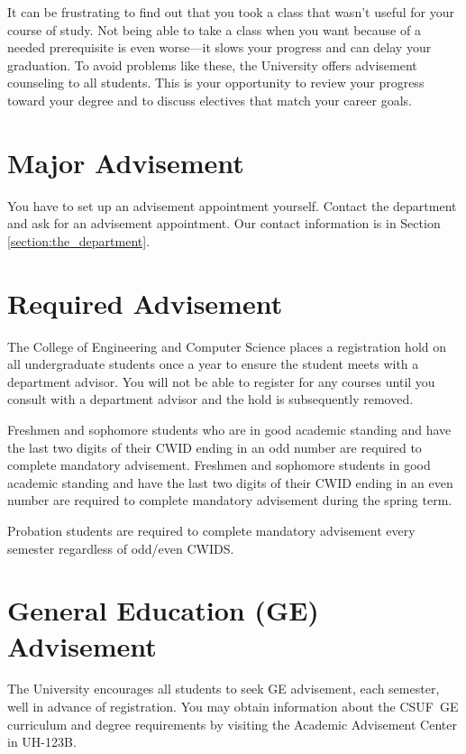 \documentclass{book}
\newcommand{\CampusName}{CSUF}
\begin{document}
It can be frustrating to find out that you took a class that wasn't useful for your course of study. Not being able to take a class when you want because of a needed prerequisite is even worse---it slows your progress and can delay your graduation. To avoid problems like these, the University offers advisement counseling to all students. This is your opportunity to review your progress toward your degree and to discuss electives that match your career goals.

\section{Major Advisement}
You have to set up an advisement appointment yourself. Contact the department and ask for an advisement appointment. Our contact information is in Section \ref{section:the_department}.

\section{Required Advisement}
The College of Engineering and Computer Science places a registration hold on all undergraduate students once a year to ensure the student meets with a department advisor. You will not be able to register for any courses until you consult with a department advisor and the hold is subsequently removed.

Freshmen and sophomore students who are in good academic standing and have the last two digits of their CWID ending in an odd number are required to complete mandatory advisement. Freshmen and sophomore students in good academic standing and have the last two digits of their CWID ending in an even number are required to complete mandatory advisement during the spring term.

Probation students are required to complete mandatory advisement every semester regardless of odd/even CWIDS.

\section{General Education (GE) Advisement}
 
The University encourages all students to seek GE advisement, each semester, well in advance of registration.  You may obtain information about the \CampusName~GE curriculum and degree requirements by visiting the Academic Advisement Center in UH-123B.
\end{document}
